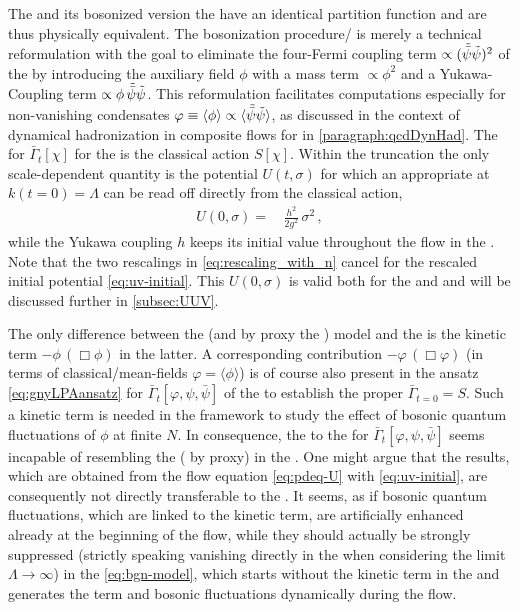 The \gnm{} and its bosonized version \dash{} the \bgnm{} \dash{} have an identical partition function and are thus physically equivalent.
The bosonization procedure/\hsTrafo{} is merely a technical reformulation with the goal to eliminate the four-Fermi coupling term $\propto ( \tilde{\bar{\psi}} \tilde{\psi} )^2$ of the \gnm{} by introducing the auxiliary field $\phi$  with a mass term $\propto \phi^2$ and a Yukawa-Coupling term $\propto \phi \, \tilde{\bar{\psi}} \tilde{\psi}$.
This reformulation facilitates computations especially for non-vanishing condensates $\varphi\equiv \langle \phi \rangle \propto \langle \tilde{\bar{\psi}} \tilde{\psi} \rangle$, as discussed in the context of dynamical hadronization in composite \frg{} flows for \qcd{} in \cref{paragraph:qcdDynHad}.
The \ic{} for $\bar{\Gamma}_t [ \chi ]$ for the \frgEq{} is the classical action $S[ \chi ]$.
Within the \lpa{} truncation the only scale-dependent quantity is the potential $U ( t, \sigma )$ for which an appropriate \ic{} at $k ( t = 0) = \Lambda$ can be read off directly from the classical action,
\begin{align}
	U ( 0, \sigma ) = \, & \tfrac{h^2}{2 g^2} \, \sigma^2 \, ,	\label{eq:uv-initial}
\end{align}
while the Yukawa coupling $h$ keeps its initial value throughout the \frg{} flow in the \lpa{}.
Note that the two rescalings in \cref{eq:rescaling_with_n} cancel for the rescaled initial potential \eqref{eq:uv-initial}.
This \ic{} $U ( 0, \sigma )$ is valid both for the \bgn{} and \gnym{} and will be discussed further in \cref{subsec:UUV}.
	
The only difference between the \bgn{} (and by proxy the \gn{}) model and the \gnym{} is the kinetic term $-\phi \, ( \Box \phi )$ in the latter.
A corresponding contribution $- \varphi \, ( \Box \varphi )$ (in terms of classical/mean-fields $\varphi = \langle \phi \rangle$) is of course also present in the \lpa{} ansatz \eqref{eq:gnyLPAansatz} for $\bar{\Gamma}_t [\varphi, \psi, \bar{\psi}]$ of the \gnym{} to establish the proper \ic{} $\bar{\Gamma}_{t = 0} = S$.
Such a kinetic term is needed in the \frg{} framework to study the effect of bosonic quantum fluctuations of $\phi$ at finite $N$.
In consequence, the \lpa{} to the \gnym{} for $\bar{\Gamma}_t [\varphi, \psi, \bar{\psi}]$ seems incapable of resembling the \bgnm{} (\gnm{} by proxy) in the \uv{}.
One might argue that the results, which are obtained from the \frg{} flow equation \eqref{eq:pdeq-U} with \ic{} \eqref{eq:uv-initial}, are consequently not directly transferable to the \gnm{}.
It seems, as if bosonic quantum fluctuations, which are linked to the kinetic term, are artificially enhanced already at the beginning of the \frg{} flow, while they should actually be strongly suppressed (strictly speaking vanishing directly in the \uv{} when considering the limit $\Lambda\rightarrow\infty$) in the \bgnm{} \eqref{eq:bgn-model}, which starts without the kinetic term in the \uv{} and generates the term and bosonic fluctuations dynamically during the \frg{} flow.
	
